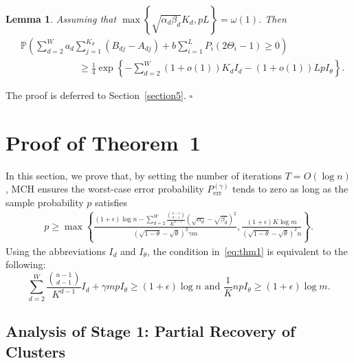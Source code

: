 \documentclass{article}
\newtheorem{lemma}{Lemma}
\newenvironment{proof}{{\noindent\it Proof:}\quad}{\hfill $\square$\par}
\begin{document}
\begin{lemma}\label{lemma3}
Assuming that $\max \left\{ \sqrt{\alpha_d \beta_d}K_d, pL \right\}=\omega(1)$. Then
\begin{equation}\label{eqn4}
    \begin{aligned}
&\mathbb{P} \left( \sum_{d=2}^{W} a_d  \sum_{j=1}^{K_d} (B_{dj} - A_{dj}) + b \sum_{i=1}^{L}P_i(2\Theta_i - 1) \geq 0  \right) \\
 &\qquad\qquad\qquad \geq \frac{1}{4}\exp \left\{ - \sum_{d=2}^{W}(1+o(1))K_d I_d - (1+o(1)) L p I_\theta \right\}.
    \end{aligned}
\end{equation}
\end{lemma}
\begin{proof}
    The proof is deferred to Section~\ref{section5}.
\end{proof}



\section{Proof of Theorem~1}\label{section3}
In this section, we prove that, by setting the number of iterations $T=O(\log n)$, MCH ensures the worst-case error probability $P_{\text{err}}^{(\gamma)}$ tends to zero as long as the sample probability $p$  satisfies
\begin{align}
p \geq \max \left\{ \frac{(1+\epsilon)\log n - \sum_{d=2}^{W} \frac{\binom{n-1}{d-1}}{K^{d-1}} (\sqrt{\alpha_d}-\sqrt{\beta_d})^2}{(\sqrt{1-\theta} - \sqrt{\theta})^2 \gamma m}, \frac{ (1+\epsilon) K \log m}{(\sqrt{1-\theta} - \sqrt{\theta})^2 n} \right\}. \label{eq:thm1}
\end{align}
Using the abbreviations $I_d$ and $I_{\theta}$, the condition in~\eqref{eq:thm1} is equivalent to the following:
\begin{equation}
    \sum_{d=2}^W \frac{\binom{n-1}{d-1}}{K^{d-1}} I_d + \gamma m p I_{\theta} \geq (1+\epsilon) \log n \text{ \ and \ } \frac{1}{K} n p I_{\theta} \geq (1+\epsilon) \log m.
\end{equation}


\subsection{Analysis of Stage 1: Partial Recovery of Clusters}
\end{document}
